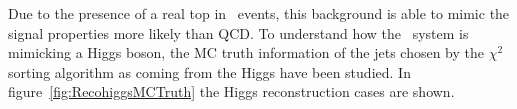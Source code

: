 Due to the presence of a real top in \ttbar~events, this background is able to mimic the signal properties more likely than QCD. To understand how the \ttbar~system is mimicking a Higgs boson, the MC truth information of the jets chosen by the $\chi^{2}$ sorting algorithm as coming from the Higgs have been studied. In figure~\ref{fig:RecohiggsMCTruth} the Higgs reconstruction cases are shown. %


